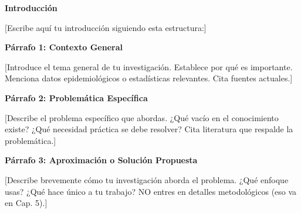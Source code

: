 % 

\begin{center}
{\fontsize{12}{14}\selectfont\bfseries Introducción}\\[24pt]
\end{center}
\label{cap:introduccion}
\justifying
\setlength{\parskip}{0pt}

%

\noindent 
{[Escribe aquí tu introducción siguiendo esta estructura:]}

\textbf{Párrafo 1: Contexto General}

{[Introduce el tema general de tu investigación. Establece por qué es importante. Menciona datos epidemiológicos o estadísticas relevantes. Cita fuentes actuales.]}

\textbf{Párrafo 2: Problemática Específica}

{[Describe el problema específico que abordas. ¿Qué vacío en el conocimiento existe? ¿Qué necesidad práctica se debe resolver? Cita literatura que respalde la problemática.]}

\textbf{Párrafo 3: Aproximación o Solución Propuesta}

{[Describe brevemente cómo tu investigación aborda el problema. ¿Qué enfoque usas? ¿Qué hace único a tu trabajo? NO entres en detalles metodológicos (eso va en Cap. 5).]}

